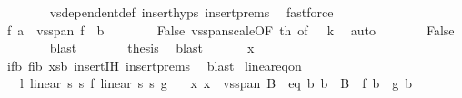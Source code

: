 \begin{isabellebody}
\ \ \ \ \ \ \isamarkupfalse%
\ vs{}{\isachardot}{\kern0pt}dependent{\isacharunderscore}{\kern0pt}def\ insert{\isachardot}{\kern0pt}hyps{\isacharparenleft}{\kern0pt}{}{\isacharparenright}{\kern0pt}\ insert{\isachardot}{\kern0pt}prems{\isacharparenleft}{\kern0pt}{}{\isacharparenright}{\kern0pt}\ \isamarkupfalse%
\ fastforce\isanewline
\ \ \ \ \isamarkupfalse%
\ \isamarkupfalse%
\ {\isachardoublequoteopen}f\ a\ {\isasymin}\ vs{}{\isachardot}{\kern0pt}span\ {\isacharparenleft}{\kern0pt}f\ {\isacharbackquote}{\kern0pt}\ b{\isacharparenright}{\kern0pt}{\isachardoublequoteclose}\isanewline
\ \ \ \ \ \ \isamarkupfalse%
\ False\ vs{}{\isachardot}{\kern0pt}span{\isacharunderscore}{\kern0pt}scale{\isacharbrackleft}{\kern0pt}OF\ th{\isacharcomma}{\kern0pt}\ of\ {\isachardoublequoteopen}{\isacharminus}{\kern0pt}\ {}{\isacharslash}{\kern0pt}\ k{\isachardoublequoteclose}{\isacharbrackright}{\kern0pt}\ \isamarkupfalse%
\ auto\isanewline
\ \ \ \ \isamarkupfalse%
\ \isamarkupfalse%
\ False\isanewline
\ \ \ \ \ \ \isamarkupfalse%
\ blast\isanewline
\ \ \ \ \isamarkupfalse%
\ \isamarkupfalse%
\ {\isacharquery}{\kern0pt}thesis\ \isamarkupfalse%
\ blast\isanewline
\ \ \isamarkupfalse%
\isanewline
\ \ \isamarkupfalse%
\ {\isachardoublequoteopen}x\ {\isacharequal}{\kern0pt}\ {}{\isachardoublequoteclose}\isanewline
\ \ \ \ \isamarkupfalse%
\ ifb\ fib\ xsb\ insert{\isachardot}{\kern0pt}IH\ insert{\isachardot}{\kern0pt}prems{\isacharparenleft}{\kern0pt}{}{\isacharparenright}{\kern0pt}\ \isamarkupfalse%
\ blast\isanewline
{}\isamarkupfalse%
%
\endisatagproof
{\isafoldproof}%
%
\isadelimproof
\isanewline
%
\endisadelimproof
\isanewline
{}\isamarkupfalse%
\ linear{\isacharunderscore}{\kern0pt}eq{\isacharunderscore}{\kern0pt}on{\isacharcolon}{\kern0pt}\isanewline
\ \ \ l{\isacharcolon}{\kern0pt}\ {\isachardoublequoteopen}linear\ s{}\ s{}\ f{\isachardoublequoteclose}\ {\isachardoublequoteopen}linear\ s{}\ s{}\ g{\isachardoublequoteclose}\isanewline
\ \ \ x{\isacharcolon}{\kern0pt}\ {\isachardoublequoteopen}x\ {\isasymin}\ vs{}{\isachardot}{\kern0pt}span\ B{\isachardoublequoteclose}\ \ eq{\isacharcolon}{\kern0pt}\ {\isachardoublequoteopen}{\isasymAnd}b{\isachardot}{\kern0pt}\ b\ {\isasymin}\ B\ {\isasymLongrightarrow}\ f\ b\ {\isacharequal}{\kern0pt}\ g\ b{\isachardoublequoteclose}\isanewline

\end{isabellebody}
